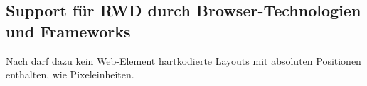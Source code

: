 
\subsection{Support für RWD durch Browser-Technologien und Frameworks}

Nach \autocite{Katajisto.CreatingSupportContent.2015} darf dazu kein Web-Element hartkodierte Layouts mit absoluten Positionen enthalten, wie Pixeleinheiten.
